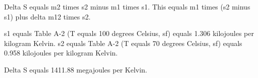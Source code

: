 Delta S equals m2 times s2 minus m1 times s1.  
This equals m1 times (s2 minus s1) plus delta m12 times s2.  

s1 equals Table A-2 (T equals 100 degrees Celsius, sf) equals 1.306 kilojoules per kilogram Kelvin.  
s2 equals Table A-2 (T equals 70 degrees Celsius, sf) equals 0.958 kilojoules per kilogram Kelvin.  

Delta S equals 1411.88 megajoules per Kelvin.